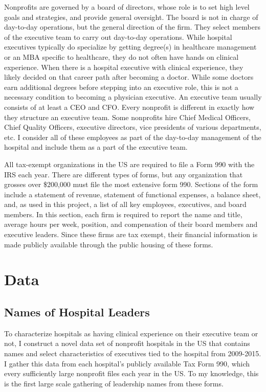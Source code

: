 \documentclass[12pt]{article}
\begin{document}
    Nonprofits are governed by a board of directors, whose role is to set high level goals and strategies, and provide general oversight. The board is not in charge of day-to-day operations, but the general direction of the firm. They select members of the executive team to carry out day-to-day operations. While hospital executives typically do specialize by getting degree(s) in healthcare management or an MBA specific to healthcare, they do not often have hands on clinical experience. When there is a hospital executive with clinical experience, they likely decided on that career path after becoming a doctor. While some doctors earn additional degrees before stepping into an executive role, this is not a necessary condition to becoming a physician executive. An executive team usually consists of at least a CEO and CFO. Every nonprofit is different in exactly how they structure an executive team. Some nonprofits hire Chief Medical Officers, Chief Quality Officers, executive directors, vice presidents of various departments, etc. I consider all of these employees as part of the day-to-day management of the hospital and include them as a part of the executive team. 

    All tax-exempt organizations in the US are required to file a Form 990 with the IRS each year. There are different types of forms, but any organization that grosses over \$200,000 must file the most extensive form 990. Sections of the form include a statement of revenue, statement of functional expenses, a balance sheet, and, as used in this project, a list of all key employees, executives, and board members. In this section, each firm is required to report the name and title, average hours per week, position, and compensation of their board members and executive leaders. Since these firms are tax exempt, their financial information is made publicly available through the public housing of these forms.  

  
	
	\section{Data}\label{sec:data}

    \subsection{Names of Hospital Leaders}

    To characterize hospitals as having clinical experience on their executive team or not, I construct a novel data set of nonprofit hospitals in the US that contains names and select characteristics of executives tied to the hospital from 2009-2015. I gather this data from each hospital's publicly available Tax Form 990, which every sufficiently large nonprofit files each year in the US. To my knowledge, this is the first large scale gathering of leadership names from these forms. 
\end{document}
